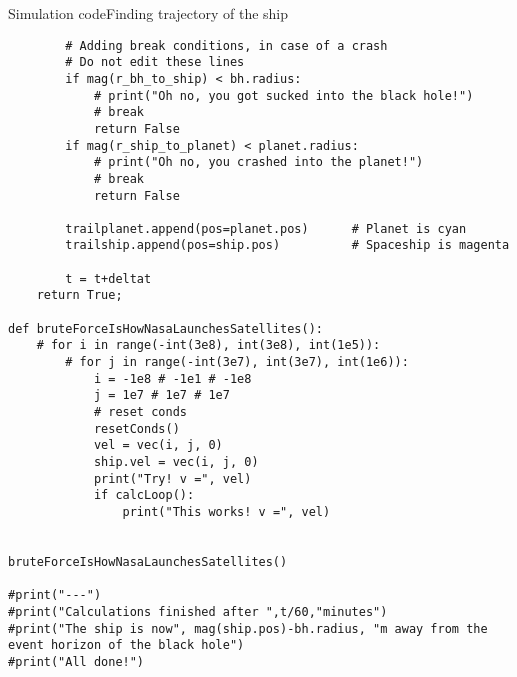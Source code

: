 \begin{frame}[fragile]{Simulation code}{Finding trajectory of the ship}
\begin{multicols}{2}
\begin{verbatim}
        # Adding break conditions, in case of a crash
        # Do not edit these lines
        if mag(r_bh_to_ship) < bh.radius:
            # print("Oh no, you got sucked into the black hole!")
            # break
            return False
        if mag(r_ship_to_planet) < planet.radius:
            # print("Oh no, you crashed into the planet!")
            # break
            return False
    
        trailplanet.append(pos=planet.pos)      # Planet is cyan
        trailship.append(pos=ship.pos)          # Spaceship is magenta
        
        t = t+deltat
    return True;
    
def bruteForceIsHowNasaLaunchesSatellites():
    # for i in range(-int(3e8), int(3e8), int(1e5)):
        # for j in range(-int(3e7), int(3e7), int(1e6)):
            i = -1e8 # -1e1 # -1e8
            j = 1e7 # 1e7 # 1e7
            # reset conds
            resetConds()
            vel = vec(i, j, 0)
            ship.vel = vec(i, j, 0)
            print("Try! v =", vel)
            if calcLoop():
                print("This works! v =", vel)
        

bruteForceIsHowNasaLaunchesSatellites()

#print("---")
#print("Calculations finished after ",t/60,"minutes")
#print("The ship is now", mag(ship.pos)-bh.radius, "m away from the event horizon of the black hole")
#print("All done!")
\end{verbatim}
\end{multicols}
\end{frame}